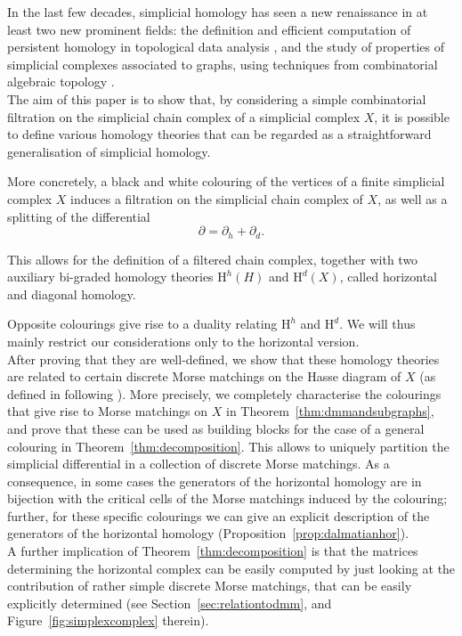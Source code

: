 \documentclass[11pt, a4paper, reqno, twoside, makeidx]{amsart}
\theoremstyle{remark}
\theoremstyle{plain}
\theoremstyle{definition}
\newcommand{\HH}{\mathrm{H}}
\begin{document}
In the last few decades, simplicial homology has seen a new renaissance in at least two new prominent fields: the definition and efficient computation of persistent homology in topological data analysis \cite{edelsbrunner2008persistent}, and the study of properties of simplicial complexes associated to graphs, using techniques from combinatorial algebraic topology \cite{kozlov2007combinatorial}. \\

The aim of this paper is to show that, by considering a simple combinatorial filtration on the simplicial chain complex of a simplicial complex $X$, it is possible to define various homology theories that can be regarded as a straightforward generalisation of simplicial homology. 

More concretely, a black and white colouring of the vertices of a finite simplicial complex $X$ induces a filtration on the simplicial chain complex of $X$, as well as a splitting of the differential $$\partial = \partial_h + \partial_d.$$ 

This allows for the definition of a filtered chain complex, together with two auxiliary bi-graded homology theories $\HH^h(H)$ and $\HH^d(X)$, called horizontal and diagonal homology.

Opposite colourings give rise to a duality relating $\HH^h$ and $\HH^d$. We will thus mainly restrict our considerations only to the horizontal version.\\


After proving that they are well-defined, we show that these homology theories are related to certain discrete Morse matchings on the Hasse diagram of $X$ (as defined in \cite{chari2000discrete} following \cite{forman1998morse}). More precisely, we completely characterise the colourings that give rise to Morse matchings on $X$ in Theorem~\ref{thm:dmmandsubgraphs}, and prove that these can be used as building blocks for the case of a general colouring in Theorem~\ref{thm:decomposition}. This allows to uniquely partition the simplicial differential in a collection of discrete Morse matchings.
As a consequence, in some cases the generators of the horizontal homology are in bijection with the critical cells of the Morse matchings induced by the colouring; further, for these specific colourings we can give an explicit description of the generators of the horizontal homology (Proposition~\ref{prop:dalmatianhor}).\\
A further implication of Theorem~\ref{thm:decomposition} is that the matrices determining the horizontal complex can be easily computed by just looking at the contribution of rather simple discrete Morse matchings, that can be easily explicitly determined (see Section~\ref{sec:relationtodmm}, and Figure~\ref{fig:simplexcomplex} therein).\\
\end{document}
